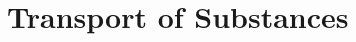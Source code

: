 \def\abs#1{\lvert#1\rvert}
\def\argdot{{\hspace{0.18em}\cdot\hspace{0.18em}}}
\def\D{{\tn D}}
\def\div{\operatorname{div}}
\def\grad{\nabla}
\def\n{\vc n}
\def\vc#1{\mathbf{\boldsymbol{#1}}}     %
\def\R{\mathbb R}
\def\sc#1#2{\left(#1,#2\right)}
\def\th{\vartheta}
\def\Tr{\operatorname{Tr}}
\def\where{\,|\,}


\section{Transport of Substances}
\label{sc:transport_model}

